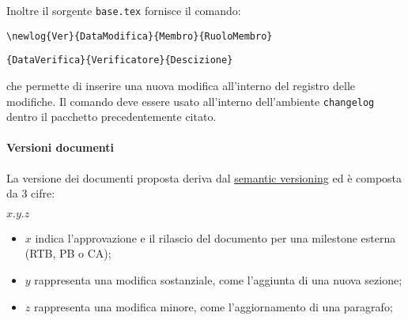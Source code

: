             Inoltre il sorgente \verb|base.tex| fornisce il comando:
            \begin{center}
                \verb*|\newlog{Ver}{DataModifica}{Membro}{RuoloMembro}|\par\verb|{DataVerifica}{Verificatore}{Descizione}|
            \end{center}
            che permette di inserire una nuova modifica all'interno del registro delle modifiche. Il comando deve essere usato all'interno dell'ambiente \verb|changelog| dentro il pacchetto precedentemente citato.

        \paragraph{Versioni documenti} \label{sec:doc_version}
            La versione dei documenti proposta deriva dal \href{https://semver.org/}{semantic versioning} ed è composta da 3 cifre:
            \begin{center}
                $x.y.z$
            \end{center}
            \begin{itemize}
            	\item $x$ indica l'approvazione e il rilascio del documento per una milestone esterna (RTB, PB o CA);
                \item $y$ rappresenta una modifica sostanziale, come l'aggiunta di una nuova sezione;
                \item $z$ rappresenta una modifica minore, come l'aggiornamento di una paragrafo;
            \end{itemize}

